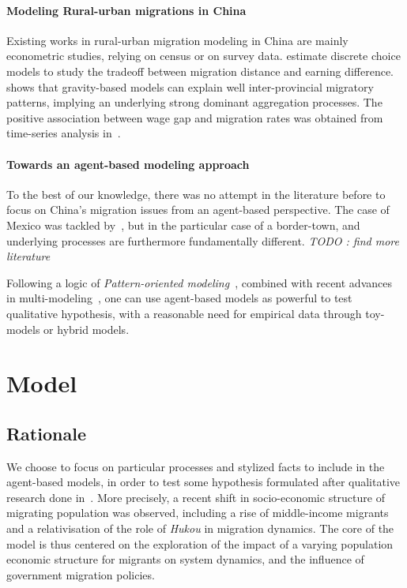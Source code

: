 \paragraph{Modeling Rural-urban migrations in China}

Existing works in rural-urban migration modeling in China are mainly econometric studies, relying on census or on survey data. \cite{zhang2013measuring} estimate discrete choice models to study the tradeoff between migration distance and earning difference. \cite{fan2005modeling} shows that gravity-based models can explain well inter-provincial migratory patterns, implying an underlying strong dominant aggregation processes. The positive association between wage gap and migration rates was obtained from time-series analysis in~\cite{zhang2003rural}.

\paragraph{Towards an agent-based modeling approach}

To the best of our knowledge, there was no attempt in the literature before to focus on China's migration issues from an agent-based perspective. The case of Mexico was tackled by~\cite{de2007netlogo}, but in the particular case of a border-town, and underlying processes are furthermore fundamentally different. \textit{TODO : find more literature}

Following a logic of \emph{Pattern-oriented modeling}~\cite{grimm2005pattern}, combined with recent advances in multi-modeling~\cite{cottineau2016back}, one can use agent-based models as powerful to test qualitative hypothesis, with a reasonable need for empirical data through toy-models or hybrid models.



\section{Model}

\subsection{Rationale}

We choose to focus on particular processes and stylized facts to include in the agent-based models, in order to test some hypothesis formulated after qualitative research done in~\cite{losavio2016analyser}. More precisely, a recent shift in socio-economic structure of migrating population was observed, including a rise of middle-income migrants and a relativisation of the role of \emph{Hukou} in migration dynamics. The core of the model is thus centered on the exploration of the impact of a varying population economic structure for migrants on system dynamics, and the influence of government migration policies.

